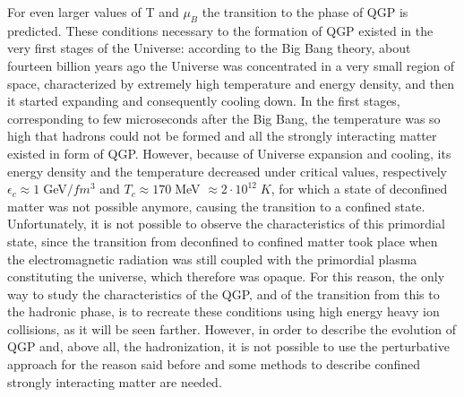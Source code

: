 For even larger values of T and $\mu_{B}$ the transition to the phase of QGP is predicted. These conditions necessary to the formation of QGP existed in the very first stages of the Universe: according to the Big Bang theory, about fourteen billion years ago the Universe was concentrated in a very small region of space, characterized by extremely high temperature and energy density, and then it started expanding and consequently cooling down. In the first stages, corresponding to few microseconds after the Big Bang, the temperature was so high that hadrons could not be formed and all the strongly interacting matter existed in form of QGP. However, because of Universe expansion and cooling, its energy density and the temperature decreased under critical values, respectively $\epsilon_{c}\approx1 \;$GeV$/fm^{3}$ and $T_{c}\approx 170\; $MeV $ \approx 2\cdot10^{12}\; K$, for which a state of deconfined matter was not possible anymore, causing the transition to a confined state.\\ Unfortunately, it is not possible to observe the characteristics of this primordial state, since the transition from deconfined to confined matter took place when the electromagnetic radiation was still coupled with the primordial plasma constituting the universe, which therefore was opaque. For this reason, the only way to study the characteristics of the QGP, and of the transition from this to the hadronic phase, is to recreate these conditions using high energy heavy ion collisions, as it will be seen farther. However, in order to describe the evolution of QGP and, above all, the hadronization, it is not possible to use the perturbative approach for the reason said before and some methods to describe confined strongly interacting matter are needed.
%
